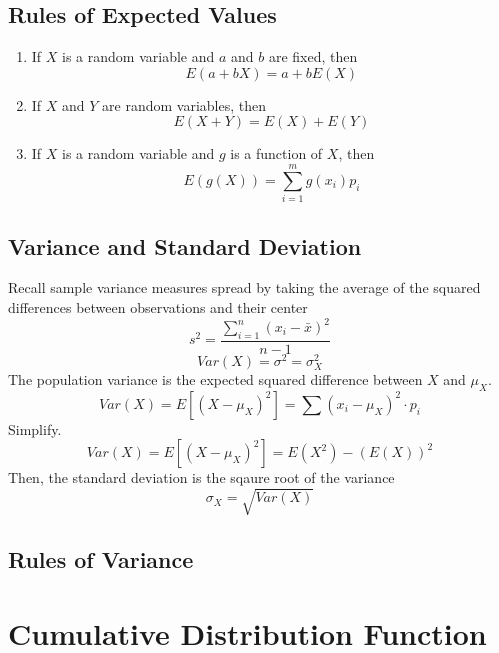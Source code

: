 \subsection{Rules of Expected Values}  %
\begin{enumerate}
    \item If $X$ is a random variable and $a$ and $b$ are fixed, then
          \[E(a+bX)=a+bE(X)\]
    \item If $X$ and $Y$ are random variables, then
          \[E(X+Y)=E(X)+E(Y)\]
    \item If $X$ is a random variable and $g$ is a function of $X$, then
          \[E(g(X))=\sum_{i=1}^m g(x_i)p_i\]
\end{enumerate}

\subsection{Variance and Standard Deviation}  %
Recall sample variance measures spread by taking the average of the squared differences between observations and their center
\begin{equation}
    s^2=\frac{\sum_{i=1}^{n}{(x_i-\bar{x})}^2}{n-1}
\end{equation}
\begin{equation}
    Var(X)=\sigma^2 = \sigma_X^2
\end{equation}
The population variance is the expected squared difference between $X$ and $\mu_X$.
\begin{equation}
    Var(X)=E[{(X-\mu_X)}^2]=\sum{(x_i-\mu_X)}^2\cdot p_i
\end{equation}
Simplify.
\begin{equation}
    Var(X)=E[{(X-\mu_X)}^2]=E(X^2)-(E(X))^2
\end{equation}
Then, the standard deviation is the sqaure root of the variance
\begin{equation}
    \sigma_X=\sqrt{Var(X)}
\end{equation}

\subsection{Rules of Variance}  %

\section{Cumulative Distribution Function}  %

